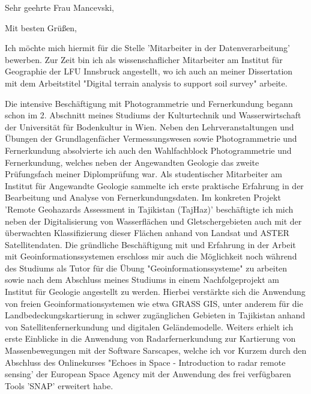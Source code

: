 \documentclass[11pt,a4paper,sans]{moderncv}        %
\begin{document}

\date{22. Nov, 2018}
\opening{Sehr geehrte Frau Mancevski,}
\closing{Mit besten Gr\"{u}{\ss}en,}

\makelettertitle
\justify
Ich m\"{o}chte mich hiermit f\"{u}r die Stelle 'Mitarbeiter in der Datenverarbeitung' bewerben. Zur Zeit bin ich als wissenschaflicher Mitarbeiter am Institut f\"{u}r Geographie der LFU Innsbruck angestellt, wo ich auch an meiner Dissertation mit dem Arbeitstitel "Digital terrain analysis to support soil survey" arbeite.

Die intensive Besch\"{a}ftigung mit Photogrammetrie und Fernerkundung begann schon im 2. Abschnitt meines Studiums der Kulturtechnik und Wasserwirtschaft der Universit\"{a}t f\"{u}r Bodenkultur in Wien. Neben den Lehrveranstaltungen und \"{U}bungen der Grundlagenf\"{a}cher Vermessungswesen sowie Photogrammetrie und Fernerkundung absolvierte ich auch den Wahlfachblock Photogrammetrie und Fernerkundung, welches neben der Angewandten Geologie das zweite Pr\"{u}fungsfach meiner Diplompr\"{u}fung war. Als studentischer Mitarbeiter am Institut f\"{u}r Angewandte Geologie sammelte ich erste praktische Erfahrung in der Bearbeitung und Analyse von Fernerkundungsdaten. Im konkreten Projekt 'Remote Geohazards Assessment in Tajikistan (TajHaz)' besch\"{a}ftigte ich mich neben der Digitalisierung von Wasserflächen und Gletschergebieten auch mit der überwachten Klassifizierung dieser Fl\"achen anhand von Landsat und ASTER Satellitendaten.  Die gr\"undliche Beschäftigung mit und Erfahrung in der Arbeit mit Geoinformationssystemen erschloss mir auch die Möglichkeit noch w\"ahrend des Studiums als Tutor f\"{u}r die \"{U}bung "Geoinformationssysteme" zu arbeiten sowie nach dem Abschluss meines Studiums in einem Nachfolgeprojekt am Institut f\"{u}r Geologie angestellt zu werden. Hierbei verstärkte sich die Anwendung von freien Geoinformationsystemen wie etwa GRASS GIS, unter anderem f\"{u}r die Landbedeckungskartierung in schwer zug\"anglichen Gebieten in Tajikistan anhand von Satellitenfernerkundung und digitalen Geländemodelle. Weiters erhielt ich erste Einblicke in die Anwendung von Radarfernerkundung zur Kartierung von Massenbewegungen mit der Software Sarscapes, welche ich vor Kurzem durch den Abschluss des Onlinekurses "Echoes in Space - Introduction to radar remote sensing' der European Space Agency mit der Anwendung des frei verfügbaren Tools 'SNAP' erweitert habe.
\end{document}
